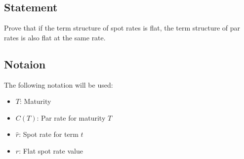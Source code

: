 \subsection{Statement}
Prove that if the term structure of spot rates is flat, the term structure of
par rates is also flat at the same rate.\par

\subsection{Notaion}
The following notation will be used:\par
\begin{itemize}
    \item
    $T$: Maturity
    \item
    $C(T)$: Par rate for maturity $T$
    \item
    $\hat{r}$: Spot rate for term $t$
    \item
    $r$: Flat spot rate value
\end{itemize}

